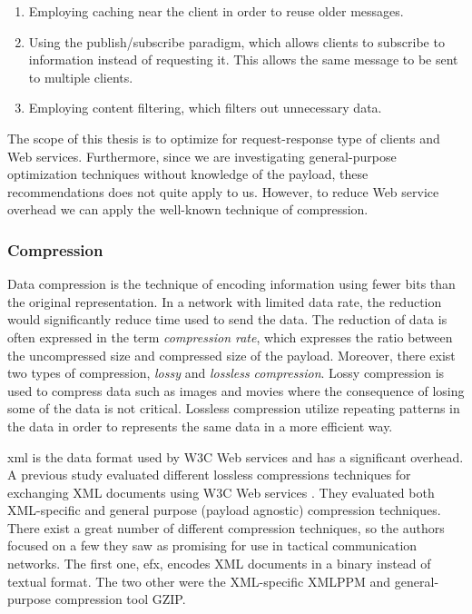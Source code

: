 \begin{enumerate}
    \item Employing caching near the client in order to reuse older messages.
    \item Using the publish/subscribe paradigm, which allows clients to subscribe to
    information instead of requesting it. This allows the same message to be sent
    to multiple clients.
    \item Employing content filtering, which filters out unnecessary data.
\end{enumerate}

The scope of this thesis is to optimize for request-response type of clients
and Web services. Furthermore, since we are investigating general-purpose
optimization techniques without knowledge of the payload, these
recommendations does not quite apply to us. However, to reduce Web service
overhead we can apply the well-known technique of compression.

\subsubsection{Compression}

Data compression is the technique of encoding information using fewer bits than
the original representation. In a network with limited data rate, the reduction
would significantly reduce time used to send the data. The reduction of data is
often expressed in the term \textit{compression rate}, which expresses the ratio
between the uncompressed size and compressed size of the payload.  Moreover,
there exist two types of compression, \textit{lossy} and \textit{lossless
compression}. Lossy compression is used to compress data such as images and
movies where the consequence of losing some of the data is not critical.
Lossless compression utilize repeating patterns in the data in order to
represents the same data in a more efficient way.

\gls{xml} is the data format used by W3C Web services and has a significant
overhead. A previous study evaluated different lossless compressions techniques
for exchanging XML documents using W3C Web services \cite{johnsen-compression}.
They evaluated both XML-specific and general purpose (payload agnostic)
compression techniques. There exist a great number of different compression
techniques, so the authors focused on a few they saw as promising for use in
tactical communication networks. The first one, \gls{efx}, encodes XML documents
in a binary instead of textual format. The two other were the XML-specific XMLPPM
and general-purpose compression tool GZIP.

